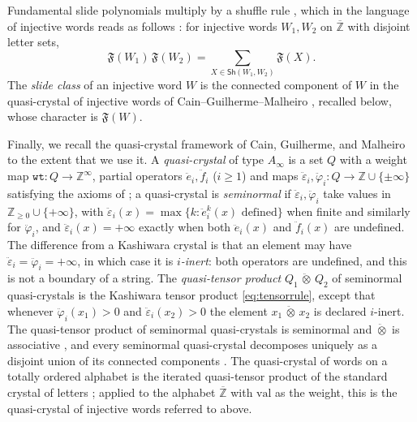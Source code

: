 \documentclass{amsart}
\theoremstyle{definition}
\theoremstyle{remark}
\numberwithin{equation}{subsection}
\newcommand{\wtt}{\mathtt{wt}}
\begin{document}
Fundamental slide polynomials multiply by a shuffle rule \cite[Theorem~5.11]{assaf2017slide}, which in the language of injective words reads as follows \cite[\S5]{nadeau2024ppartitions}: for injective words $W_1,W_2$ on $\overline{\mathbb Z}$ with disjoint letter sets,
\begin{equation}\label{eq:slideshuffle}
\mathfrak F(W_1)\,\mathfrak F(W_2) = \sum_{X\in\mathsf{Sh}(W_1,W_2)}\mathfrak F(X).
\end{equation}
The \emph{slide class} of an injective word $W$ is the connected component of $W$ in the quasi-crystal of injective words of Cain--Guilherme--Malheiro \cite[\S5]{cain2023quasicrystals}, recalled below, whose character is $\mathfrak F(W)$.

Finally, we recall the quasi-crystal framework of Cain, Guilherme, and Malheiro \cite{cain2023quasicrystals} to the extent that we use it. A \emph{quasi-crystal} of type $A_\infty$ is a set $Q$ with a weight map $\wtt:Q\to\mathbb{Z}^\infty$, partial operators $\ddot e_i,\ddot f_i$ ($i\geq 1$) and maps $\ddot\varepsilon_i,\ddot\varphi_i:Q\to\mathbb{Z}\cup\{\pm\infty\}$ satisfying the axioms of \cite[Definition~3.1]{cain2023quasicrystals}; a quasi-crystal is \emph{seminormal} \cite[Definition~3.9]{cain2023quasicrystals} if $\ddot\varepsilon_i,\ddot\varphi_i$ take values in $\mathbb{Z}_{\geq 0}\cup\{+\infty\}$, with $\ddot\varepsilon_i(x)=\max\{k:\ddot e_i^k(x)\text{ defined}\}$ when finite and similarly for $\ddot\varphi_i$, and $\ddot\varepsilon_i(x)=+\infty$ exactly when both $\ddot e_i(x)$ and $\ddot f_i(x)$ are undefined. The difference from a Kashiwara crystal is that an element may have $\ddot\varepsilon_i=\ddot\varphi_i=+\infty$, in which case it is \emph{$i$-inert}: both operators are undefined, and this is not a boundary of a string. The \emph{quasi-tensor product} $Q_1\,\ddot\otimes\,Q_2$ of seminormal quasi-crystals \cite[\S5]{cain2023quasicrystals} is the Kashiwara tensor product \eqref{eq:tensorrule}, except that whenever $\ddot\varphi_i(x_1)>0$ and $\ddot\varepsilon_i(x_2)>0$ the element $x_1\,\ddot\otimes\,x_2$ is declared $i$-inert. The quasi-tensor product of seminormal quasi-crystals is seminormal and $\ddot\otimes$ is associative \cite[Theorem~5.1]{cain2023quasicrystals}, and every seminormal quasi-crystal decomposes uniquely as a disjoint union of its connected components \cite[Proposition~4.6]{cain2023quasicrystals}. The quasi-crystal of words on a totally ordered alphabet is the iterated quasi-tensor product of the standard crystal of letters \cite[\S5]{cain2023quasicrystals}; applied to the alphabet $\overline{\mathbb Z}$ with $\mathrm{val}$ as the weight, this is the quasi-crystal of injective words referred to above.
\end{document}
